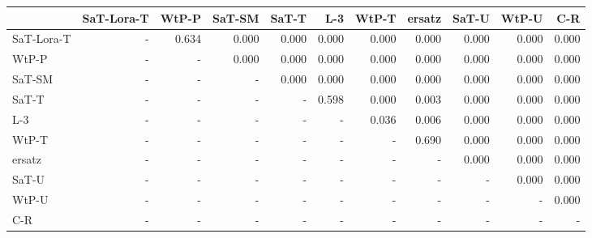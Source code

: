 \begin{tabular}{lrrrrrrrrrr}
\toprule
 & SaT-Lora-T & WtP-P & SaT-SM & SaT-T & L-3 & WtP-T & ersatz & SaT-U & WtP-U & C-R \\
\midrule
SaT-Lora-T & - & 0.634 & 0.000 & 0.000 & 0.000 & 0.000 & 0.000 & 0.000 & 0.000 & 0.000 \\
WtP-P & - & - & 0.000 & 0.000 & 0.000 & 0.000 & 0.000 & 0.000 & 0.000 & 0.000 \\
SaT-SM & - & - & - & 0.000 & 0.000 & 0.000 & 0.000 & 0.000 & 0.000 & 0.000 \\
SaT-T & - & - & - & - & 0.598 & 0.000 & 0.003 & 0.000 & 0.000 & 0.000 \\
L-3 & - & - & - & - & - & 0.036 & 0.006 & 0.000 & 0.000 & 0.000 \\
WtP-T & - & - & - & - & - & - & 0.690 & 0.000 & 0.000 & 0.000 \\
ersatz & - & - & - & - & - & - & - & 0.000 & 0.000 & 0.000 \\
SaT-U & - & - & - & - & - & - & - & - & 0.000 & 0.000 \\
WtP-U & - & - & - & - & - & - & - & - & - & 0.000 \\
C-R & - & - & - & - & - & - & - & - & - & - \\
\bottomrule
\end{tabular}

